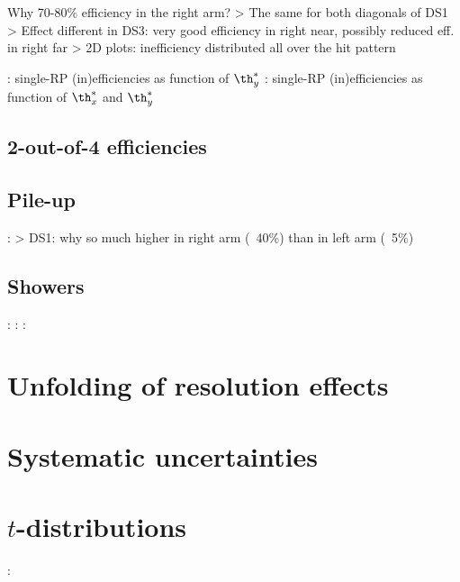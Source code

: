 \> Why 70-80\% efficiency in the right arm?
\>> The same for both diagonals of DS1
\>> Effect different in DS3: very good efficiency in right near, possibly reduced eff. in right far
\>> 2D plots: inefficiency distributed all over the hit pattern

\>  : single-RP (in)efficiencies as function of $\th_y^*$
\>  : single-RP (in)efficiencies as function of $\th_x^*$ and $\th_y^*$

\subsection{2-out-of-4 efficiencies}

\subsection{Pile-up}

\>  : 
\>> DS1: why so much higher in right arm (~40\%) than in left arm (~5\%)


\subsection{Showers}

\>  : 
\>  : 
\>  : 

\section{Unfolding of resolution effects}


\section{Systematic uncertainties}


\section{$t$-distributions}

\>  : 

\bye
